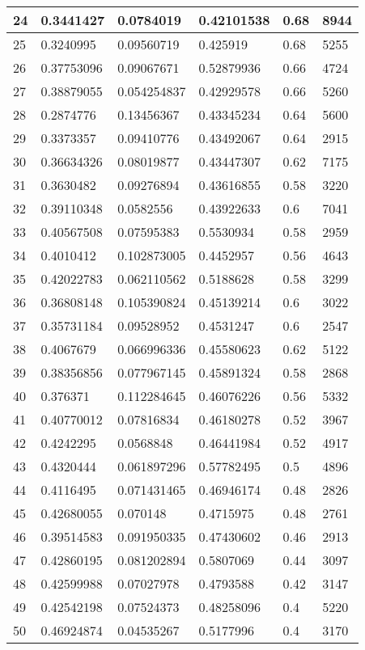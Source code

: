 \begin{longtable}{|l|l|l|l|l|l|}
24 & 0.3441427 & 0.0784019 & 0.42101538 & 0.68 & 8944 \\ \hline 
25 & 0.3240995 & 0.09560719 & 0.425919 & 0.68 & 5255 \\ \hline 
26 & 0.37753096 & 0.09067671 & 0.52879936 & 0.66 & 4724 \\ \hline 
27 & 0.38879055 & 0.054254837 & 0.42929578 & 0.66 & 5260 \\ \hline 
28 & 0.2874776 & 0.13456367 & 0.43345234 & 0.64 & 5600 \\ \hline 
29 & 0.3373357 & 0.09410776 & 0.43492067 & 0.64 & 2915 \\ \hline 
30 & 0.36634326 & 0.08019877 & 0.43447307 & 0.62 & 7175 \\ \hline 
31 & 0.3630482 & 0.09276894 & 0.43616855 & 0.58 & 3220 \\ \hline 
32 & 0.39110348 & 0.0582556 & 0.43922633 & 0.6 & 7041 \\ \hline 
33 & 0.40567508 & 0.07595383 & 0.5530934 & 0.58 & 2959 \\ \hline 
34 & 0.4010412 & 0.102873005 & 0.4452957 & 0.56 & 4643 \\ \hline 
35 & 0.42022783 & 0.062110562 & 0.5188628 & 0.58 & 3299 \\ \hline 
36 & 0.36808148 & 0.105390824 & 0.45139214 & 0.6 & 3022 \\ \hline 
37 & 0.35731184 & 0.09528952 & 0.4531247 & 0.6 & 2547 \\ \hline 
38 & 0.4067679 & 0.066996336 & 0.45580623 & 0.62 & 5122 \\ \hline 
39 & 0.38356856 & 0.077967145 & 0.45891324 & 0.58 & 2868 \\ \hline 
40 & 0.376371 & 0.112284645 & 0.46076226 & 0.56 & 5332 \\ \hline 
41 & 0.40770012 & 0.07816834 & 0.46180278 & 0.52 & 3967 \\ \hline 
42 & 0.4242295 & 0.0568848 & 0.46441984 & 0.52 & 4917 \\ \hline 
43 & 0.4320444 & 0.061897296 & 0.57782495 & 0.5 & 4896 \\ \hline 
44 & 0.4116495 & 0.071431465 & 0.46946174 & 0.48 & 2826 \\ \hline 
45 & 0.42680055 & 0.070148 & 0.4715975 & 0.48 & 2761 \\ \hline 
46 & 0.39514583 & 0.091950335 & 0.47430602 & 0.46 & 2913 \\ \hline 
47 & 0.42860195 & 0.081202894 & 0.5807069 & 0.44 & 3097 \\ \hline 
48 & 0.42599988 & 0.07027978 & 0.4793588 & 0.42 & 3147 \\ \hline 
49 & 0.42542198 & 0.07524373 & 0.48258096 & 0.4 & 5220 \\ \hline 
50 & 0.46924874 & 0.04535267 & 0.5177996 & 0.4 & 3170 \\ \hline 
\end{longtable}
